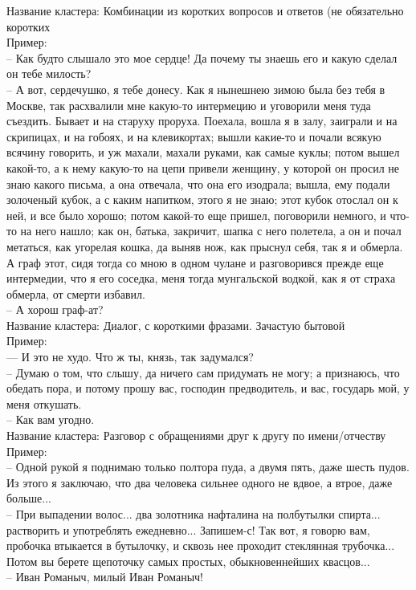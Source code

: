 \documentclass[a4paper,14pt]{article}
\begin{document}
Название кластера: Комбинации из коротких вопросов и ответов (не обязательно коротких\\
Пример: \\
-- Как будто слышало это мое сердце! Да почему ты знаешь его и какую сделал он тебе
              милость? \\
-- А вот, сердечушко, я тебе донесу. Как я нынешнею зимою была без тебя в Москве, так
              расхвалили мне какую-то интермецию и уговорили меня туда съездить. Бывает и на старуху
              проруха. Поехала, вошла я в залу, заиграли и на скрипицах, и на гобоях, и на
              клевикортах; вышли какие-то и почали всякую всячину говорить, и уж махали, махали
              руками, как самые куклы; потом вышел какой-то, а к нему какую-то на цепи привели
              женщину, у которой он просил не знаю какого письма, а она отвечала, что она его
              изодрала; вышла, ему подали золоченый кубок, а с каким напитком, этого я не знаю; этот
              кубок отослал он к ней, и все было хорошо; потом какой-то еще пришел, поговорили
              немного, и что-то на него нашло; как он, батька, закричит, шапка с него полетела, а он
              и почал метаться, как угорелая кошка, да выняв нож, как прыснул себя, так я и обмерла.
              А граф этот, сидя тогда со мною в одном чулане и разговорився прежде еще интермедии,
              что я его соседка, меня тогда мунгальской водкой, как я от страха обмерла, от смерти
              избавил. \\
-- А хорош граф-ат? \\



Название кластера: Диалог, с короткими фразами. Зачастую бытовой \\
Пример: \\
--- И это не худо.  Что ж ты, князь, так задумался? \\
-- Думаю о том, что слышу, да ничего сам придумать не могу; а признаюсь, что обедать
              пора, и потому прошу вас, господин предводитель,  и вас,
              государь мой, у меня откушать. \\
-- Как вам угодно. \\



Название кластера: Разговор с обращениями друг к другу по имени/отчеству \\
Пример: \\
-- Одной рукой я поднимаю только полтора пуда, а двумя пять, даже шесть пудов. Из этого
              я заключаю, что два человека сильнее одного не вдвое, а втрое, даже больше... \\
-- При выпадении волос... два золотника нафталина на полбутылки спирта... растворить и
              употреблять ежедневно... Запишем-с! Так вот, я говорю вам, пробочка втыкается в бутылочку, и сквозь нее проходит
              стеклянная трубочка... Потом вы берете щепоточку самых простых, обыкновеннейших
              квасцов... \\
-- Иван Романыч, милый Иван Романыч! \\
\end{document}
